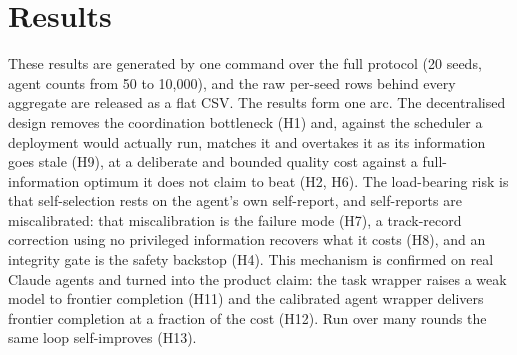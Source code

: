 \documentclass[11pt]{article}
\begin{document}
\section{Results}\label{sec:results}

These results are generated by one command over the full protocol (20 seeds, agent counts from 50 to 10{,}000), and the raw per-seed rows behind every aggregate are released as a flat CSV. The results form one arc. The decentralised design removes the coordination bottleneck (H1) and, against the scheduler a deployment would actually run, matches it and overtakes it as its information goes stale (H9), at a deliberate and bounded quality cost against a full-information optimum it does not claim to beat (H2, H6). The load-bearing risk is that self-selection rests on the agent's own self-report, and self-reports are miscalibrated: that miscalibration is the failure mode (H7), a track-record correction using no privileged information recovers what it costs (H8), and an integrity gate is the safety backstop (H4). This mechanism is confirmed on real Claude agents and turned into the product claim: the task wrapper raises a weak model to frontier completion (H11) and the calibrated agent wrapper delivers frontier completion at a fraction of the cost (H12). Run over many rounds the same loop self-improves (H13).
\end{document}
